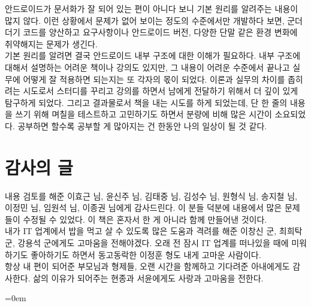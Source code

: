 \documentclass[a4paper,hidelinks,10pt,openany]{book} %
\begin{document}
안드로이드가 문서화가 잘 되어 있는 편이 아니다 보니 기본 원리를 알려주는 내용이 많지 않다. 
이런 상황에서 문제가 없어 보이는 정도의 수준에서만 개발하다 보면, 군더더기 코드를 양산하고 요구사항이나 안드로이드 버전, 다양한 단말 같은 환경 변화에 취약해지는 문제가 생긴다.\\

기본 원리를 알려면 결국 안드로이드 내부 구조에 대한 이해가 필요하다.
내부 구조에 대해서 설명하는 어려운 책이나 강의도 있지만, 
그 내용이 어려운 수준에서 끝나고 실무에 어떻게 잘 적용하면 되는지는 또 각자의 몫이 되었다. 
이론과 실무의 차이를 좁히려는 시도로서 스터디를 꾸리고 강의를 하면서 
남에게 전달하기 위해서 더 깊이 있게 탐구하게 되었다.
그리고 결과물로서 책을 내는 시도를 하게 되었는데, 단 한 줄의 내용을 쓰기 위해 며칠을 테스트하고 고민하기도 하면서 분량에 비해 많은 시간이 소요되었다.
공부하면 할수록 공부할 게 많아지는 건 한동안 나의 일상이 될 것 같다.

\section{감사의 글}
내용 검토를 해준 이효근 님, 윤신주 님, 김태중 님, 김성수 님, 원형식 님, 송지철 님, 이정민 님, 임원석 님, 이종권 님에게 감사드린다. 
이 분들 덕분에 내용에서 많은 문제들이 수정될 수 있었다. 이 책은 혼자서 한 게 아니라 함께 만들어낸 것이다.\\

내가 IT 업계에서 밥을 먹고 살 수 있도록 많은 도움과 격려를 해준 이창신 군, 최희탁 군, 강용석 군에게도 고마움을 전해야겠다.
오래 전 잠시 IT 업계를 떠나있을 때에 미워하기도 좋아하기도 하면서 동고동락한 이정훈 형도 내게 고마운 사람이다.\\

항상 내 편이 되어준 부모님과 형제들, 
오랜 시간을 함께하고 기다려준 아내에게도 감사한다. 삶의 이유가 되어주는 현종과 서윤에게도 사랑과 고마움을 전한다.

\begin{comment}
나도 책과 인터넷에서 많은 도움을 받았다. 
오래 전 팀 동료가 그런 얘기를 했다. ``국내 IT서적은 다 쓰레기다'' 그 동료는 책 꽂이에 원서만 나열해놓고 있었다.
어쩌면 쓰레기 하나를 더 만들었는지도 모르겠다.

좌충우돌한 이야기


죄와벌 이나 태백산맥 같은 역작을 내는 것도 아닌데, 무슨 시간이 이리 많이 걸리는지..
\end{comment}

\tableofcontents

\parindent=0em
\end{document}
